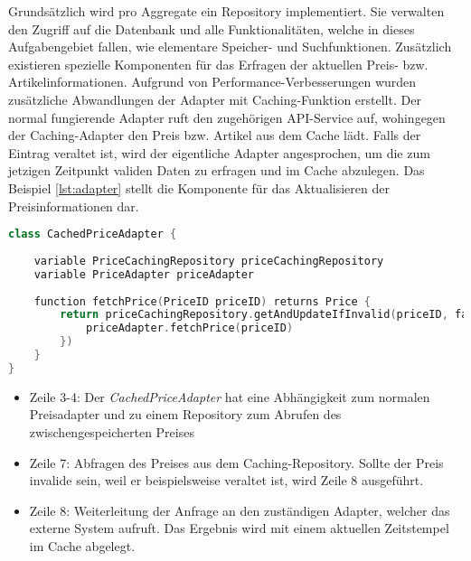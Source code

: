 Grundsätzlich wird pro Aggregate ein Repository implementiert. Sie verwalten den Zugriff auf die Datenbank und alle Funktionalitäten, welche in dieses Aufgabengebiet fallen, wie elementare Speicher- und Suchfunktionen. Zusätzlich existieren spezielle Komponenten für das Erfragen der aktuellen Preis- bzw. Artikelinformationen. Aufgrund von Performance-Verbesserungen wurden zusätzliche Abwandlungen der Adapter mit Caching-Funktion erstellt. Der normal fungierende Adapter ruft den zugehörigen API-Service auf, wohingegen der Caching-Adapter den Preis bzw. Artikel aus dem Cache lädt. Falls der Eintrag veraltet ist, wird der eigentliche Adapter angesprochen, um die zum jetzigen Zeitpunkt validen Daten zu erfragen und im Cache abzulegen. Das Beispiel \ref{lst:adapter} stellt die Komponente für das Aktualisieren der Preisinformationen dar. 

\vspace{0,5cm}
\begin{minipage}{\linewidth} %
	\begin{lstlisting}[caption={Preisadapter mit Caching-Funktion}, label={lst:adapter}, language=Kotlin]
class CachedPriceAdapter {
	
	variable PriceCachingRepository priceCachingRepository 
	variable PriceAdapter priceAdapter
	
	function fetchPrice(PriceID priceID) returns Price {
		return priceCachingRepository.getAndUpdateIfInvalid(priceID, fallback = {
			priceAdapter.fetchPrice(priceID)
		})
	}
}
	\end{lstlisting}
	\begin{itemize}[noitemsep,nolistsep]
		\item Zeile 3-4: Der \emph{CachedPriceAdapter} hat eine Abhängigkeit zum normalen Preisadapter und zu einem Repository zum Abrufen des zwischengespeicherten Preises
		\item Zeile 7: Abfragen des Preises aus dem Caching-Repository. Sollte der Preis invalide sein, weil er beispielsweise veraltet ist, wird Zeile 8 ausgeführt.
		\item Zeile 8: Weiterleitung der Anfrage an den zuständigen Adapter, welcher das externe System aufruft. Das Ergebnis wird mit einem aktuellen Zeitstempel im Cache abgelegt.
	\end{itemize}
\end{minipage}
